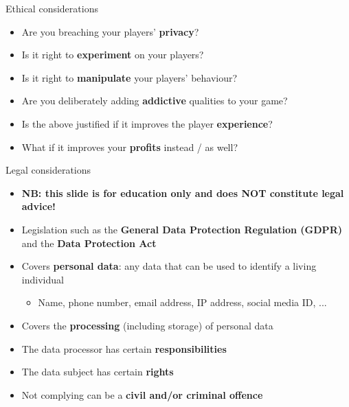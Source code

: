 \begin{frame}{Ethical considerations}
	\begin{itemize}
		\pause\item Are you breaching your players' \textbf{privacy}?
		\pause\item Is it right to \textbf{experiment} on your players?
		\pause\item Is it right to \textbf{manipulate} your players' behaviour?
		\pause\item Are you deliberately adding \textbf{addictive} qualities to your game?
		\pause\item Is the above justified if it improves the player \textbf{experience}?
		\pause\item What if it improves your \textbf{profits} instead / as well?
	\end{itemize}
\end{frame}

\begin{frame}{Legal considerations}
	\begin{itemize}
		\pause\item \textbf{NB: this slide is for education only and does NOT constitute legal advice!}
        \pause\item Legislation such as the \textbf{General Data Protection Regulation (GDPR)} and the
            \textbf{Data Protection Act}
		\pause\item Covers \textbf{personal data}: any data that can be used to identify a living individual
			\begin{itemize}
				\pause\item Name, phone number, email address, IP address, social media ID, ...
			\end{itemize}
		\pause\item Covers the \textbf{processing} (including storage) of personal data
		\pause\item The data processor has certain \textbf{responsibilities}
		\pause\item The data subject has certain \textbf{rights}
		\pause\item Not complying can be a \textbf{civil and/or criminal offence}
	\end{itemize}
\end{frame}
